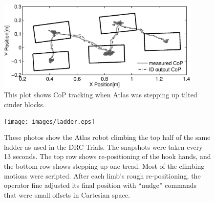 \documentclass{ws-ijhr}
\begin{document}
\begin{figure}
  \begin{center}
    \includegraphics[width=0.9\textwidth]{images/cop_gray.eps} 
    \caption{
      This plot shows CoP tracking when Atlas was stepping up tilted cinder blocks.}

    \label{fig:walk_cop} 
  \end{center}
\end{figure}    

\begin{figure}
  \begin{center}
    {\texttt{[image: images/ladder.eps]}}
    \caption{
      These photos show the Atlas robot climbing the top half of the same 
      ladder as used in the DRC Trials. 
			The snapshots were taken every 13 seconds. 
			The top row shows re-positioning of the hook hands, 
			and the bottom row shows stepping up one tread. 
			Most of the climbing motions were scripted. 
			After each limb's rough re-positioning, the operator fine adjusted
			its final position with ``nudge'' commands that were small offsets 
			in Cartesian space. 
      }\label{fig:ladder_pic} 
  \end{center}
\end{figure}    
\end{document}
